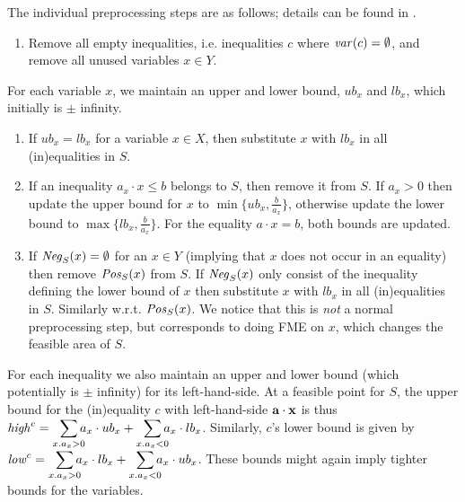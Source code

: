 The individual preprocessing steps are as follows; details can be found in \cite{MyTechRep}.
%
\begin{enumerate} \itemsep0em
	\item Remove all empty inequalities, i.e. inequalities $c$ where $\mathit{var}(c)=\emptyset$, and remove all unused variables $x\in Y$.
\setcounter{counterName}{\value{enumi}}
\end{enumerate}
For each variable $x$, we maintain an upper and lower bound, $ub_x$ and $lb_x$, which initially is $\pm$ infinity.
\begin{enumerate} \itemsep0em
\setcounter{enumi}{\value{counterName}}
	\item If $ub_x = lb_x$ for a variable $x\in X$, then substitute $x$ with $lb_x$ in all (in)equalities in $S$. 
	\item If an inequality $a_x\cdot x \leq b$ belongs to $S$, then remove it from $S$. If $a_x>0$ then update the upper bound for $x$ to $\min\{ub_x,\frac{b}{a_x}\}$, otherwise update the lower bound to $\max\{lb_x,\frac{b}{a_x}\}$.
For the equality $a\cdot x = b$, both bounds are updated.
	\item If $\mathit{Neg}_S(x)=\emptyset$ for an $x\in Y$ (implying that $x$ does not occur in an equality) then remove $\mathit{Pos}_S(x)$ from $S$. If $\mathit{Neg}_S(x)$ only consist of the inequality defining the lower bound of $x$ then substitute $x$ with $lb_x$ in all (in)equalities in $S$. Similarly w.r.t. $\mathit{Pos}_S(x)$. We notice that this is \emph{not} a normal preprocessing step, but corresponds to doing FME on $x$, which changes the feasible area of $S$. 
\setcounter{counterName}{\value{enumi}}
\end{enumerate}
For each inequality we also maintain an upper and lower bound (which potentially is $\pm$ infinity) for its left-hand-side. At a feasible point for $S$, the upper bound for the (in)equality $c$ with left-hand-side $\mathbf{a}\cdot\mathbf{x}$ is thus $\mi{high}^c = \smashoperator[r]{\sum_{x. a_x>0}}a_x\cdot ub_x + \smashoperator[r]{\sum_{x.a_x<0}}a_x\cdot lb_x$. Similarly, $c$'s lower bound is given by $\mi{low}^c = \smashoperator[r]{\sum_{x.a_x>0}}a_x\cdot lb_x + \smashoperator[r]{\sum_{x.a_x<0}}a_x\cdot ub_x$.
These bounds might again imply tighter bounds for the variables. 
